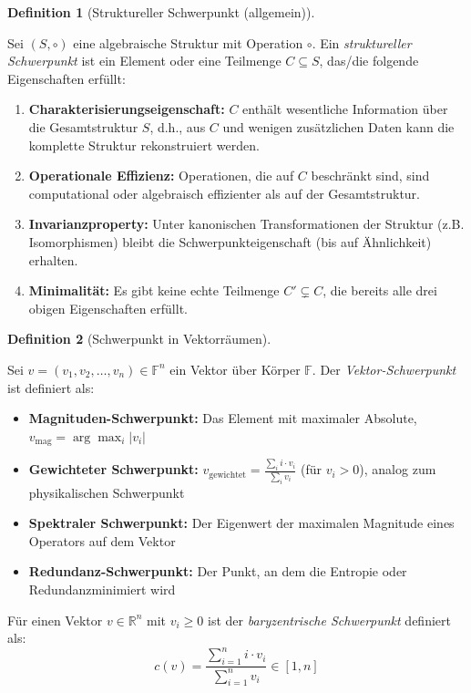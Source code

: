 \documentclass[a4paper,12pt]{article}
\theoremstyle{definition}
\newtheorem{definition}{Definition}
\begin{document}
\begin{definition}[Struktureller Schwerpunkt (allgemein)]
\label{def:schwerpunkt_allgemein}

Sei $(S, \circ)$ eine algebraische Struktur mit Operation $\circ$. Ein \emph{struktureller Schwerpunkt} ist ein Element oder eine Teilmenge $C \subseteq S$, das/die folgende Eigenschaften erfüllt:

\begin{enumerate}
\item \textbf{Charakterisierungseigenschaft:} $C$ enthält wesentliche Information über die Gesamtstruktur $S$, d.h., aus $C$ und wenigen zusätzlichen Daten kann die komplette Struktur rekonstruiert werden.

\item \textbf{Operationale Effizienz:} Operationen, die auf $C$ beschränkt sind, sind computational oder algebraisch effizienter als auf der Gesamtstruktur.

\item \textbf{Invarianzproperty:} Unter kanonischen Transformationen der Struktur (z.B. Isomorphismen) bleibt die Schwerpunkteigenschaft (bis auf Ähnlichkeit) erhalten.

\item \textbf{Minimalität:} Es gibt keine echte Teilmenge $C' \subsetneq C$, die bereits alle drei obigen Eigenschaften erfüllt.
\end{enumerate}
\end{definition}

\begin{definition}[Schwerpunkt in Vektorräumen]
\label{def:schwerpunkt_vektor}

Sei $v = (v_1, v_2, \ldots, v_n) \in \mathbb{F}^n$ ein Vektor über Körper $\mathbb{F}$. Der \emph{Vektor-Schwerpunkt} ist definiert als:

\begin{itemize}
\item \textbf{Magnituden-Schwerpunkt:} Das Element mit maximaler Absolute, $v_{\text{mag}} = \arg\max_i |v_i|$

\item \textbf{Gewichteter Schwerpunkt:} $v_{\text{gewichtet}} = \frac{\sum_i i \cdot v_i}{\sum_i v_i}$ (für $v_i > 0$), analog zum physikalischen Schwerpunkt

\item \textbf{Spektraler Schwerpunkt:} Der Eigenwert der maximalen Magnitude eines Operators auf dem Vektor

\item \textbf{Redundanz-Schwerpunkt:} Der Punkt, an dem die Entropie oder Redundanzminimiert wird
\end{itemize}

Für einen Vektor $v \in \mathbb{R}^n$ mit $v_i \geq 0$ ist der \emph{baryzentrische Schwerpunkt} definiert als:
\[
c(v) = \frac{\sum_{i=1}^n i \cdot v_i}{\sum_{i=1}^n v_i} \in [1, n]
\]
\end{definition}
\end{document}
